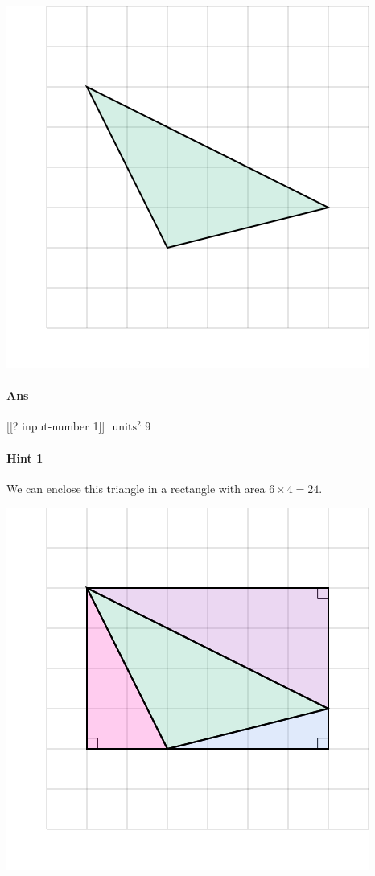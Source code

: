 \documentclass[twocolumn,10pt]{article}
\def\shrinkfactor{0.55}
\begin{document}
\includegraphics[scale=\shrinkfactor]{figures/f106ebaafe03d69cdae7e1cefc0501c437c31a98.png}

\paragraph{Ans} [[? input-number 1]] $\text{ units}^2$  9

\paragraph{Hint 1}We can enclose this triangle in a rectangle with area $6 \times 4 =24$.   

\includegraphics[scale=\shrinkfactor]{figures/f8742902f351b5e757353f5b87652f60dc589176.png}
\end{document}
